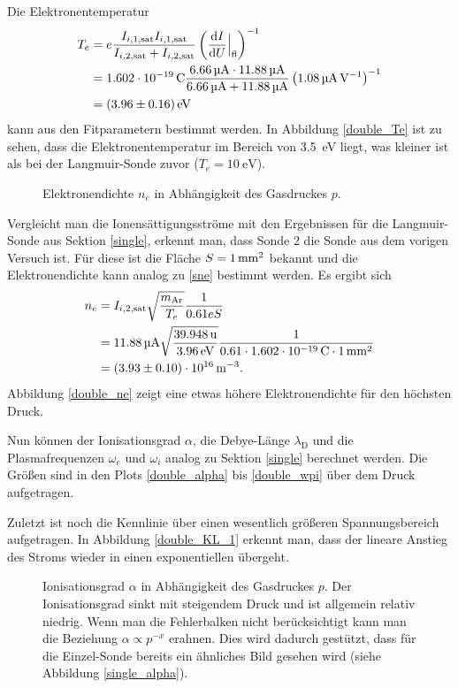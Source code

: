 Die Elektronentemperatur
\begin{align}
T_e
    &=e\frac{I_{i,1,\text{sat}}I_{i,1,\text{sat}}}{I_{i,2,\text{sat}}+I_{i,2,\text{sat}}}\left(\frac{\dd I}{\dd U}\Big\lvert_\text{fl}\right)^{-1}
    \label{dTe}\\
    &=\sie \frac{\siBIiasata\cdot\siBIibsata}{\siBIiasata+\siBIibsata}\left(\siBdIdUa\right)^{-1}\nonumber\\
    &=\sifullBTea\nonumber
\end{align}
kann aus den Fitparametern bestimmt werden.
In Abbildung \vref{double_Te} ist zu sehen, dass die Elektronentemperatur im Bereich von \SI{3.5}{\electronvolt} liegt, was kleiner ist als bei der Langmuir-Sonde zuvor ($ T_e=\SI{10}{\electronvolt}$).

\begin{figure}[htbp]
    \centering
    
    \caption{
        Elektronendichte $n_e$ in Abh\"angigkeit des Gasdruckes $p$.
    }
    \label{double_ne}
\end{figure}

Vergleicht man die Ionens\"attigungsstr\"ome mit den Ergebnissen f\"ur die Langmuir-Sonde aus Sektion \ref{single}, erkennt man, dass Sonde 2 die Sonde aus dem vorigen Versuch ist.
F\"ur diese ist die Fl\"ache $S=\siS$ bekannt und die Elektronendichte kann analog zu \eqref{sne} bestimmt werden.
Es ergibt sich
\begin{align}
n_e
    &=I_{i,2,\text{sat}}\sqrt{\frac{m_\text{Ar}}{T_e}}\frac{1}{0.61eS}\label{sne}\\
    &=\siBIibsata\sqrt{\frac{\simAr}{\siBTea}}\frac{1}{0.61\cdot \sie \cdot\siS}\nonumber\\
    &=\sifullBnea .\nonumber
\end{align}
Abbildung \vref{double_ne} zeigt eine etwas h\"ohere Elektronendichte f\"ur den h\"ochsten Druck.

Nun k\"onnen der Ionisationsgrad $\alpha$, die Debye-L\"ange $\lambda_\text{D}$ und die Plasmafrequenzen $\omega_e$ und $\omega_i$ analog zu Sektion \ref{single} berechnet werden.
Die Gr\"o\ss en sind in den Plots \vref{double_alpha} bis \vref{double_wpi} \"uber dem Druck aufgetragen.

Zuletzt ist noch die Kennlinie \"uber einen wesentlich gr\"o\ss eren Spannungsbereich aufgetragen.
In Abbildung \vref{double_KL_1} erkennt man, dass der lineare Anstieg des Stroms wieder in einen exponentiellen \"ubergeht.

\begin{figure}[htbp]
    \centering
    
    \caption{
        Ionisationsgrad $\alpha$ in Abh\"angigkeit des Gasdruckes $p$.
        Der Ionisationsgrad sinkt mit steigendem Druck und ist allgemein relativ niedrig.
        Wenn man die Fehlerbalken nicht ber\"ucksichtigt kann man die Beziehung $\alpha\propto p^{-x}$ erahnen.
        Dies wird dadurch gest\"utzt, dass f\"ur die Einzel-Sonde bereits ein \"ahnliches Bild gesehen wird (siehe Abbildung \vref{single_alpha}).
    }
    \label{double_alpha}
\end{figure}

